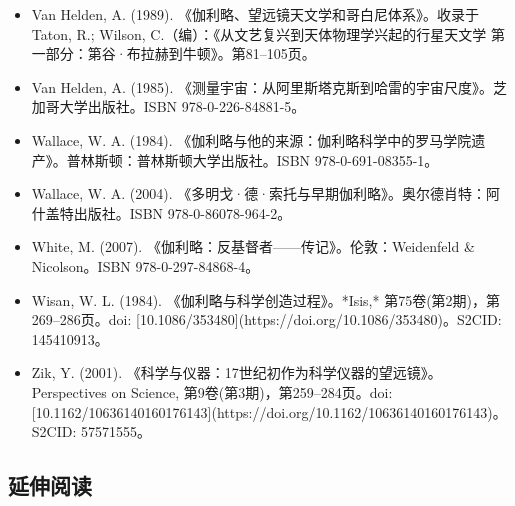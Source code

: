 \begin{itemize}
\item Van Helden, A. (1989). 《伽利略、望远镜天文学和哥白尼体系》。收录于 Taton, R.; Wilson, C.（编）：《从文艺复兴到天体物理学兴起的行星天文学 第一部分：第谷·布拉赫到牛顿》。第81–105页。  
\item Van Helden, A. (1985). 《测量宇宙：从阿里斯塔克斯到哈雷的宇宙尺度》。芝加哥大学出版社。ISBN 978-0-226-84881-5。  
\item Wallace, W. A. (1984). 《伽利略与他的来源：伽利略科学中的罗马学院遗产》。普林斯顿：普林斯顿大学出版社。ISBN 978-0-691-08355-1。  
\item Wallace, W. A. (2004). 《多明戈·德·索托与早期伽利略》。奥尔德肖特：阿什盖特出版社。ISBN 978-0-86078-964-2。  
\item White, M. (2007). 《伽利略：反基督者——传记》。伦敦：Weidenfeld & Nicolson。ISBN 978-0-297-84868-4。  
\item Wisan, W. L. (1984). 《伽利略与科学创造过程》。*Isis,* 第75卷(第2期)，第269–286页。doi: [10.1086/353480](https://doi.org/10.1086/353480)。S2CID: 145410913。  
\item Zik, Y. (2001). 《科学与仪器：17世纪初作为科学仪器的望远镜》。Perspectives on Science, 第9卷(第3期)，第259–284页。doi: [10.1162/10636140160176143](https://doi.org/10.1162/10636140160176143)。S2CID: 57571555。  
\end{itemize}
\subsection{延伸阅读}

